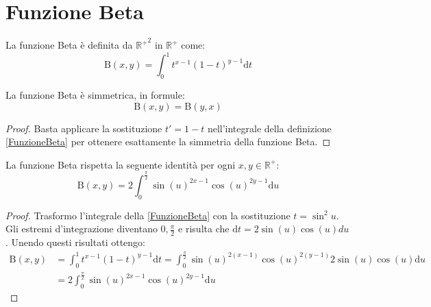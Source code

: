 \section{Funzione Beta}

\begin{definition}\label{FunzioneBeta} 
	La funzione Beta è definita da $\mathbb{R^+}^2$ in $\mathbb{R^+}$ come:
	\begin{equation*}
		\mathrm{B} (x,y)=\int_0^1 t^{x-1}(1-t)^{y-1} \mathrm{d}t
	\end{equation*}
\end{definition}

\begin{lemma}\label{BetaSimmetrica} 
	La funzione Beta è simmetrica, in formule:
	\begin{equation*}
		\mathrm{B}(x,y)=\mathrm{B}(y,x)
	\end{equation*}
\end{lemma}
\begin{proof}
	Basta applicare la sostituzione $t'=1-t$ nell'integrale della definizione \cref{FunzioneBeta} 
	per ottenere esattamente la simmetria della funzione Beta.
\end{proof}

\begin{lemma}\label{BetaTrigonometrica} 
	La funzione Beta rispetta la seguente identità per ogni $x,y\in \mathbb{R^+}$:
	\begin{equation*}
		\mathrm{B} (x,y)=2\int_0^{\frac\pi2} \sin(u)^{2x-1}\cos(u)^{2y-1}\mathrm{d}u
	\end{equation*}
\end{lemma}
\begin{proof}
	Trasformo l'integrale della \cref{FunzioneBeta} con la sostituzione $t=\sin^2u$.\\
	Gli estremi d'integrazione diventano $0,\frac{\pi}2$ e risulta che $\mathrm{d}t=2\sin(u)\cos(u)du$. Unendo questi risultati ottengo:
	\begin{equation*}\begin{split}
		\mathrm{B}(x,y) & =\int_0^1 t^{x-1}(1-t)^{y-1} \mathrm{d}t = \int_0^{\frac\pi2} \sin(u)^{2(x-1)}\cos(u)^{2(y-1)}2\sin(u)\cos(u)\mathrm{d}u\\
		& = 2\int_0^{\frac\pi2} \sin(u)^{2x-1}\cos(u)^{2y-1}\mathrm{d}u
	\end{split}\end{equation*}
\end{proof}

